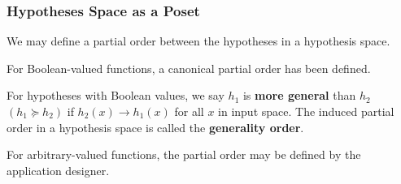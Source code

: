 \documentclass[]{beamer}
\begin{document}
\begin{frame}
\frametitle{Hypotheses Space as a Poset}
We may define a partial order between the hypotheses in a hypothesis space.

For Boolean-valued functions, a canonical partial order has been defined.

\begin{definition}
	For hypotheses with Boolean values, we say $h_1$ is \textbf{more general} than $h_2$ $(h_1 \succeq h_2)$ if $h_2(x) \rightarrow h_1(x)$ for all $x$ in input space. The induced partial order in a hypothesis space is called the \textbf{generality order}.
\end{definition}

For arbitrary-valued functions, the partial order may be defined by the application designer.

\end{frame}
\end{document}
